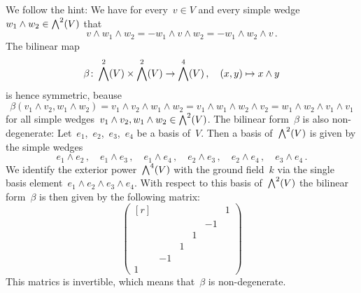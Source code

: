 \section{}





\addtocounter{subsection}{1}





\addtocounter{subsection}{1}





\subsection{}

We follow the hint:
We have for every~$v \in V$ and every simple wedge~$w_1 \wedge w_2 \in \exterior[2]{V}$ that
\[
  v \wedge w_1 \wedge w_2
  =
  - w_1 \wedge v \wedge w_2
  =
  - w_1 \wedge w_2 \wedge v \,.
\]
The bilinear map
\[
  \beta
  \colon
  \exterior[2]{V}
  \times
  \exterior[2]{V}
  \to
  \exterior[4]{V} \,,
  \quad
  (x,y)
  \mapsto
  x \wedge y
\]
is hence symmetric, beause
\[
  \beta(v_1 \wedge v_2, w_1 \wedge w_2)
  =
  v_1 \wedge v_2 \wedge w_1 \wedge w_2
  =
  v_1 \wedge w_1 \wedge w_2 \wedge v_2
  =
  w_1 \wedge w_2 \wedge v_1 \wedge v_1
\]
for all simple wedges~$v_1 \wedge v_2, w_1 \wedge w_2 \in \exterior[2]{V}$.
The bilinear form~$\beta$ is also non-degenerate:
Let~$e_1$,~$e_2$,~$e_3$,~$e_4$ be a basis of~$V$.
Then a basis of~$\exterior[2]{V}$ is given by the simple wedges
\[
  e_1 \wedge e_2  \,,
  \quad
  e_1 \wedge e_3  \,,
  \quad
  e_1 \wedge e_4  \,,
  \quad
  e_2 \wedge e_3  \,,
  \quad
  e_2 \wedge e_4  \,,
  \quad
  e_3 \wedge e_4  \,.
\]
We identify the exterior power~$\exterior[4]{V}$ with the ground field~$k$ via the single basis element~$e_1 \wedge e_2 \wedge e_3 \wedge e_4$.
With respect to this basis of~$\exterior[2]{V}$ the bilinear form~$\beta$ is then given by the following matrix:
\[
  \begin{pmatrix*}[r]
      &     &   &   &     & 1 \\
      &     &   &   & -1  &   \\
      &     &   & 1 &     &   \\
      &     & 1 &   &     &   \\
      & -1  &   &   &     &   \\
    1 &     &   &   &     &  
  \end{pmatrix*}
\]
This matrics is invertible, which means that~$\beta$ is non-degenerate.

